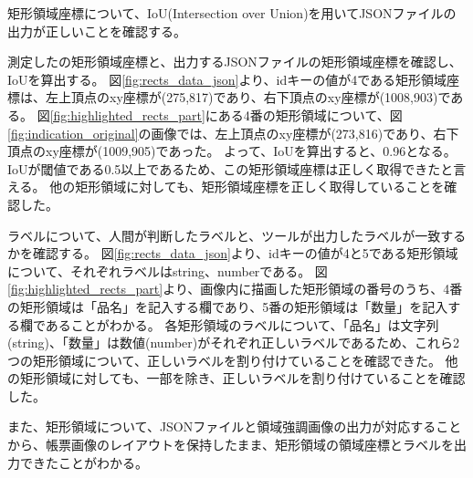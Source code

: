 矩形領域座標について、IoU(Intersection over Union)を用いてJSONファイルの出力が正しいことを確認する。

測定したの矩形領域座標と、出力するJSONファイルの矩形領域座標を確認し、IoUを算出する。
図\ref{fig:rects_data_json}より、idキーの値が4である矩形領域座標は、左上頂点のxy座標が(275,817)であり、右下頂点のxy座標が(1008,903)である。
図\ref{fig:highlighted_rects_part}にある4番の矩形領域について、図\ref{fig:indication_original}の画像では、左上頂点のxy座標が(273,816)であり、右下頂点のxy座標が(1009,905)であった。
よって、IoUを算出すると、0.96となる。
IoUが閾値である0.5以上であるため、この矩形領域座標は正しく取得できたと言える。
他の矩形領域に対しても、矩形領域座標を正しく取得していることを確認した。

ラベルについて、人間が判断したラベルと、ツールが出力したラベルが一致するかを確認する。
図\ref{fig:rects_data_json}より、idキーの値が4と5である矩形領域について、それぞれラベルはstring、numberである。
図\ref{fig:highlighted_rects_part}より、画像内に描画した矩形領域の番号のうち、4番の矩形領域は「品名」を記入する欄であり、5番の矩形領域は「数量」を記入する欄であることがわかる。
各矩形領域のラベルについて、「品名」は文字列(string)、「数量」は数値(number)がそれぞれ正しいラベルであるため、これら2つの矩形領域について、正しいラベルを割り付けていることを確認できた。
他の矩形領域に対しても、一部を除き、正しいラベルを割り付けていることを確認した。

また、矩形領域について、JSONファイルと領域強調画像の出力が対応することから、帳票画像のレイアウトを保持したまま、矩形領域の領域座標とラベルを出力できたことがわかる。

